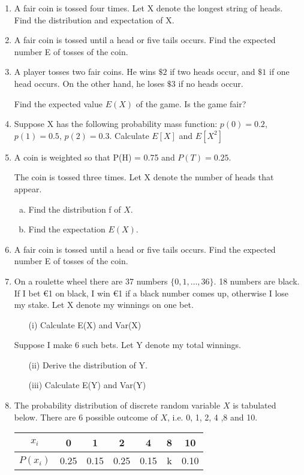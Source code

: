 \documentclass[a4paper,12pt]{article}
\begin{document}
\begin{enumerate}
\item A fair coin is tossed four times.
Let X denote the longest string of heads.
Find the distribution and expectation of X.		
		

		\item A fair coin is tossed until a head or five tails occurs.
		Find the expected number E of tosses of the coin.
		
		\item 
		A player tosses two fair coins. He wins $\$2$ if two heads occur, and $\$1$ if one head occurs. On the other hand, he loses $\$3$ if no heads occur. 
		
		Find the expected value $E(X)$ of the game. Is the game fair? 
\item 
Suppose X has the following probability mass function: $p(0) =
0.2$, $p(1) = 0.5$, $p(2) = 0.3$. Calculate $E[X]$ and $E[X^2]$



\item A coin is weighted so that P(H) = 0.75 and $P(T ) = 0.25$.

The coin is tossed three times. Let X denote the number of
heads that appear.
\begin{enumerate}[(a)]
	\item  Find the distribution f of $X$.
	\item Find the expectation $E(X)$.
\end{enumerate}
\item A fair coin is tossed until a head or five tails occurs.
Find the expected number E of tosses of the coin.


\item  On a roulette wheel there are 37 numbers $\{0,1,\ldots,36\}$. 18 numbers are black. If I bet €1 on black, I win €1 if a black number comes up, otherwise I lose my stake. Let X denote my winnings on one bet.
\begin{itemize}
	\item[(i)] Calculate E(X) and Var(X)
\end{itemize}


Suppose I make 6 such bets. Let Y denote my total winnings. 
\begin{itemize}
	\item[(ii)]Derive the distribution of Y.
	\item[(iii)]Calculate E(Y) and Var(Y)
\end{itemize}


\item  The probability distribution of discrete random variable $X$ is tabulated below. There are 6 possible outcome of $X$, i.e. 0, 1, 2, 4 ,8 and 10.
\begin{center}
	\begin{tabular}{|c||c|c|c|c|c|c|}
		\hline
		$x_i$  & 0 & 1 & 2 & 4 & 8 & 10 \\\hline
		$P(x_i)$ & 0.25 & 0.15 & 0.25 & 0.15 & k & 0.10\\
		\hline
	\end{tabular}
\end{center}


\end{enumerate}
\end{document}
